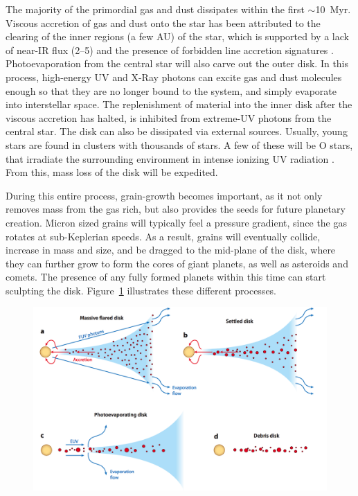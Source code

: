     The majority of the primordial gas and dust dissipates within the first $\sim$10~Myr. Viscous accretion of gas and dust onto the star has been attributed to the clearing of the inner regions (a few AU) of the star, which is supported by a lack of near-IR flux (2--5\micron) and the presence of forbidden line accretion signatures \citep[e.g., OI, SII][]{Hartigan1995}. Photoevaporation from the central star will also carve out the outer disk. In this process, high-energy UV and X-Ray photons can excite gas and dust molecules enough so that they are no longer bound to the system, and simply evaporate into interstellar space. The replenishment of material into the inner disk after the viscous accretion has halted, is inhibited from extreme-UV photons from the central star. The disk can also be dissipated via external sources. Usually, young stars are found in clusters with thousands of stars. A few of these will be O stars, that irradiate the surrounding environment in intense ionizing UV radiation \citep{Adams2004}. From this, mass loss of the disk will be expedited. 
    
    During this entire process, grain-growth becomes important, as it not only removes mass from the gas rich, but also provides the seeds for future planetary creation. Micron sized grains will typically feel a pressure gradient, since the gas rotates at sub-Keplerian speeds. As a result, grains will eventually collide, increase in mass and size, and be dragged to the mid-plane of the disk, where they can further grow to form the cores of giant planets, as well as asteroids and comets. The presence of any fully formed planets within this time can start sculpting the disk. Figure~\ref{fig:ppd_2_dd} illustrates these different processes.
    
    \begin{figure}
    \centering
    \includegraphics[width=\textwidth]{Ch1/disk_evolution_wc2011} 
    \caption[Disk Evolution Mechanisms]{\citep{Williams2011}}
    \label{fig:ppd_2_dd}
    \end{figure}
    
